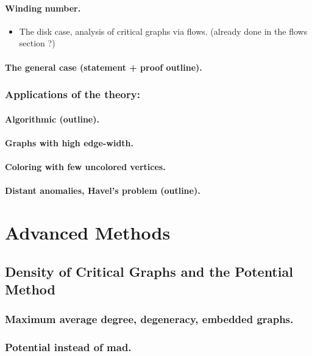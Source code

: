 \documentclass[12pt,twoside,openright,a4paper]{book}
\begin{document}
\subsection{ Winding number.}
\begin{itemize}
\item The disk case, analysis of critical graphs via flows. (already done in the flows section ?)
\end{itemize}

\subsection{The general case (statement + proof outline).}

\section{Applications of the theory:}
\subsection{Algorithmic (outline).}
\subsection{Graphs with high edge-width.}
\subsection{Coloring with few uncolored vertices.}
\subsection{Distant anomalies, Havel's problem (outline).}

\part{Advanced Methods}

\chapter{Density of Critical Graphs and the Potential Method}\label{chap:potential}


\section{Maximum average degree, degeneracy, embedded graphs.}
\section{Potential instead of mad.}
\end{document}
